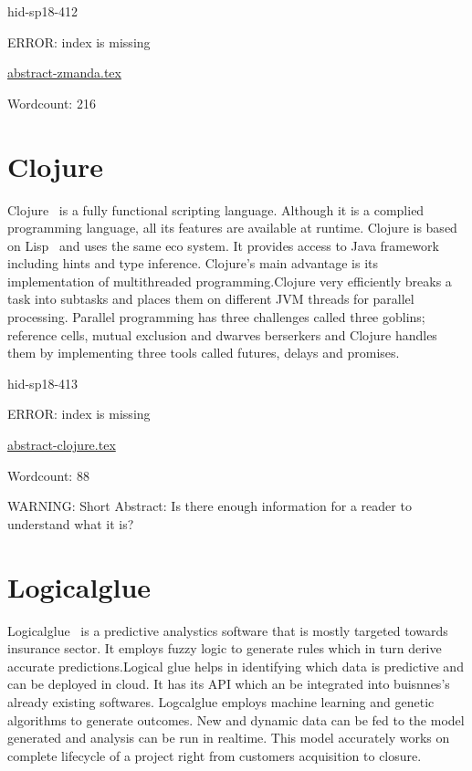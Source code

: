 \begin{IU}

hid-sp18-412

ERROR: index is missing

\href{https://github.com/cloudmesh-community/hid-sp18-412/blob/master//technology/abstract-zmanda.tex}{abstract-zmanda.tex}

 

Wordcount: 216

\end{IU}

\section{Clojure}

Clojure~\cite{hid-sp18-413-clojure} is a fully functional scripting
language. Although it is a complied programming language, all its features are
available at runtime. Clojure is based on Lisp~\cite{hid-sp18-413-lisp} and
uses the same eco system. It provides access to Java framework including hints
and type inference. Clojure’s main advantage is its implementation of
multithreaded programming.Clojure very efficiently breaks a task into subtasks
and places them on different JVM threads for parallel processing. Parallel
programming has three challenges called three goblins; reference cells, mutual
exclusion and dwarves berserkers and Clojure handles them by implementing three
tools called futures, delays and promises.


\begin{IU}

hid-sp18-413

ERROR: index is missing

\href{https://github.com/cloudmesh-community/hid-sp18-413/blob/master//technology/abstract-clojure.tex}{abstract-clojure.tex}

 

Wordcount: 88

WARNING: Short Abstract: Is there enough information for a reader to understand what it is?

\end{IU}

\section{Logicalglue}

Logicalglue~\cite{hid-sp18-413-logicalglue} is a predictive analystics software
that is mostly targeted towards insurance sector. It employs fuzzy logic to
generate rules which in turn derive accurate predictions.Logical glue helps in
identifying which data is predictive and can be deployed in cloud. It has its
API which an be integrated into buisnnes's already existing
softwares. Logcalglue employs machine learning and genetic algorithms to
generate outcomes. New and dynamic data can be fed to the model generated and
analysis can be run in realtime. This model accurately works on complete
lifecycle of a project right from customers acquisition to closure.



